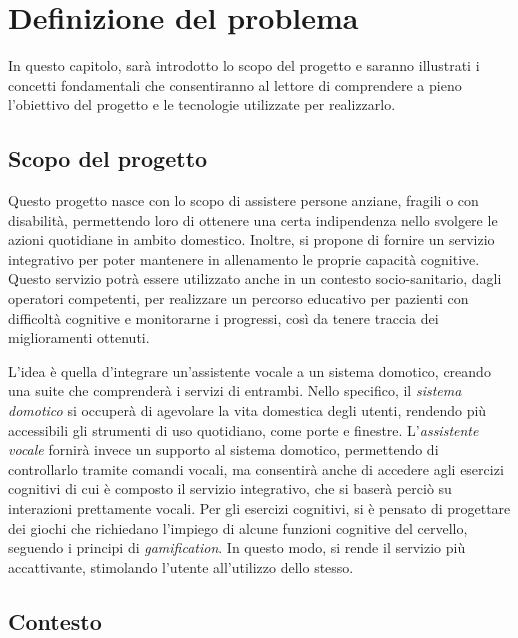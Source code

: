 
\chapter{Definizione del problema}
\label{ch:Chapter1}

In questo capitolo, sarà introdotto lo scopo del progetto e saranno illustrati
i concetti fondamentali che consentiranno al lettore di comprendere a pieno
l’obiettivo del progetto e le tecnologie utilizzate per realizzarlo.

\section{Scopo del progetto}
\label{sec:Sezione1.1}

Questo progetto nasce con lo scopo di assistere persone anziane, fragili o con
disabilità, permettendo loro di ottenere una certa indipendenza nello svolgere
le azioni quotidiane in ambito domestico. Inoltre, si propone di fornire un
servizio integrativo per poter mantenere in allenamento le proprie capacità
cognitive. Questo servizio potrà essere utilizzato anche in un contesto
socio-sanitario, dagli operatori competenti, per realizzare un percorso
educativo per pazienti con difficoltà cognitive e monitorarne i progressi, così
da tenere traccia dei miglioramenti ottenuti.

L’idea è quella d'integrare un’assistente vocale a un sistema domotico, creando
una suite che comprenderà i servizi di entrambi. Nello specifico, il
\textit{sistema domotico} si occuperà di agevolare la vita domestica degli
utenti, rendendo più accessibili gli strumenti di uso quotidiano, come porte e
finestre. L’\textit{assistente vocale} fornirà invece un supporto al sistema
domotico, permettendo di controllarlo tramite comandi vocali, ma consentirà
anche di accedere agli esercizi cognitivi di cui è composto il servizio
integrativo, che si baserà perciò su interazioni prettamente vocali. Per gli
esercizi cognitivi, si è pensato di progettare dei giochi che richiedano
l’impiego di alcune funzioni cognitive del cervello, seguendo i principi di
\textit{gamification}. In questo modo, si rende il servizio più accattivante,
stimolando l'utente all'utilizzo dello stesso.

\section{Contesto}
\label{sec:Sezione1.2}

